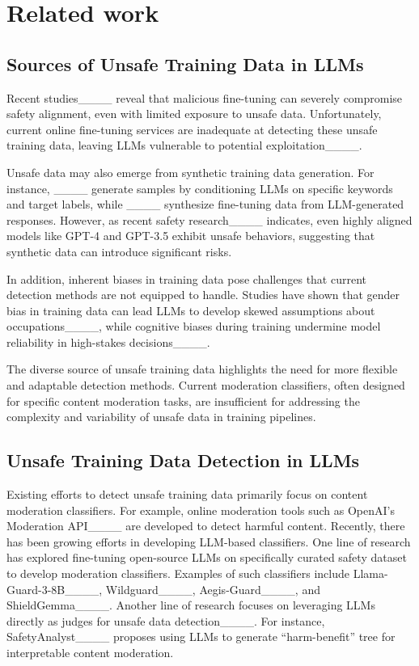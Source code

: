 \section{Related work}
\subsection{Sources of Unsafe Training Data in LLMs} 

Recent studies____ reveal that malicious fine-tuning can severely compromise safety alignment, even with limited exposure to unsafe data. Unfortunately, current online fine-tuning services are inadequate at detecting these unsafe training data, leaving LLMs vulnerable to potential exploitation____. 

Unsafe data may also emerge from synthetic training data generation. For instance, ____ generate samples by conditioning LLMs on specific keywords and target labels, while ____ synthesize fine-tuning data from LLM-generated responses. However, as recent safety research____ indicates, even highly aligned models like GPT-4 and GPT-3.5 exhibit unsafe behaviors, suggesting that synthetic data can introduce significant risks.

In addition, inherent biases in training data pose challenges that current detection methods are not equipped to handle. Studies have shown that gender bias in training data can lead LLMs to develop skewed assumptions about occupations____, while cognitive biases during training undermine model reliability in high-stakes decisions____.

The diverse source of unsafe training data highlights the need for more flexible and adaptable detection methods. Current moderation classifiers, often designed for specific content moderation tasks, are insufficient for addressing the complexity and variability of unsafe data in training pipelines. 

\subsection{Unsafe Training Data Detection in LLMs}

Existing efforts to detect unsafe training data primarily focus on content moderation classifiers. For example, online moderation tools such as OpenAI’s Moderation API____ are developed to detect harmful content. Recently, there has been growing efforts in developing LLM-based classifiers. One line of research has explored fine-tuning open-source LLMs on specifically curated safety dataset to develop moderation classifiers. Examples of such classifiers include Llama-Guard-3-8B____, Wildguard____, Aegis-Guard____, and ShieldGemma____. Another line of research focuses on leveraging LLMs directly as judges for unsafe data detection____. For instance, SafetyAnalyst____ proposes using LLMs to generate ``harm-benefit'' tree for interpretable content moderation. 

